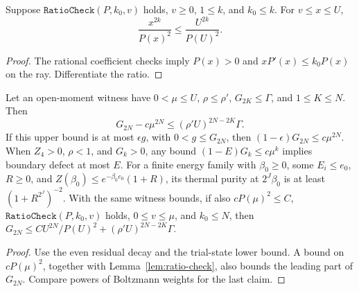 \begin{lemma}
  \label{lem:ratio-check}
  \leanok
  Suppose \(\texttt{RatioCheck}(P,k_0,v)\) holds, \(v\ge0\), \(1\le k\), and \(k_0\le k\).
  For \(v\le x\le U\),
  \[
    \frac{x^{2k}}{P(x)^2}\le\frac{U^{2k}}{P(U)^2}.
  \]
\end{lemma}
\begin{proof}
  \leanok
  The rational coefficient checks imply \(P(x)>0\) and \(xP'(x)\le k_0P(x)\) on the ray.
  Differentiate the ratio.
\end{proof}

\begin{lemma}
  \label{lem:open-initialization}
  \leanok
  Let an open-moment witness have \(0<\mu\le U\), \(\rho\le\rho'\),
  \(G_{2K}\le\Gamma\), and \(1\le K\le N\). Then
  \[
    G_{2N}-c\mu^{2N}\le(\rho'U)^{2N-2K}\Gamma.
  \]
  If this upper bound is at most \(\epsilon g\), with \(0<g\le G_{2N}\), then
  \((1-\epsilon)G_{2N}\le c\mu^{2N}\).
  When \(Z_4>0\), \(\rho<1\), and \(G_k>0\), any bound
  \((1-E)G_k\le c\mu^k\) implies boundary defect at most \(E\).
  For a finite energy family with \(\beta_0\ge0\), some \(E_i\le e_0\), \(R\ge0\), and
  \(Z(\beta_0)\le e^{-\beta_0e_0}(1+R)\), its thermal purity at \(2^J\beta_0\)
  is at least \((1+R^{2^J})^{-2}\).
  With the same witness bounds, if also \(cP(\mu)^2\le C\),
  \(\texttt{RatioCheck}(P,k_0,v)\) holds, \(0\le v\le\mu\), and \(k_0\le N\), then
  \(G_{2N}\le CU^{2N}/P(U)^2+(\rho'U)^{2N-2K}\Gamma\).
\end{lemma}
\begin{proof}
  \leanok
  Use the even residual decay and the trial-state lower bound.
  A bound on \(cP(\mu)^2\), together with Lemma~\ref{lem:ratio-check}, also bounds
  the leading part of \(G_{2N}\). Compare powers of Boltzmann weights for the last claim.
\end{proof}
